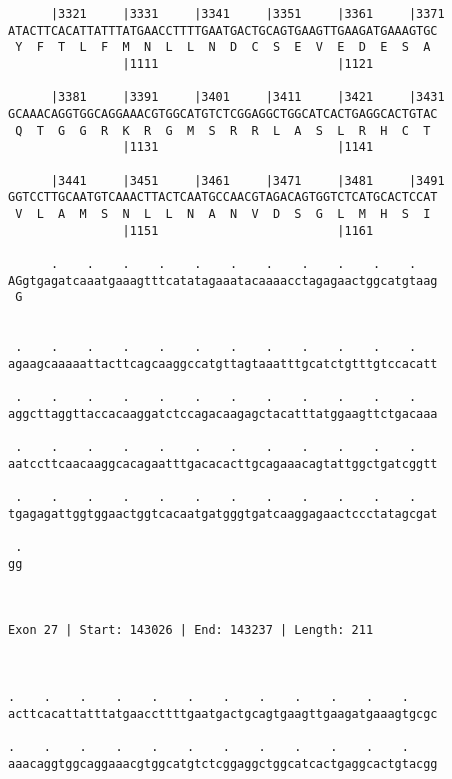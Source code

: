 \documentclass{article}
\begin{document}
\begin{Verbatim}
      |3321     |3331     |3341     |3351     |3361     |3371
ATACTTCACATTATTTATGAACCTTTTGAATGACTGCAGTGAAGTTGAAGATGAAAGTGC
 Y  F  T  L  F  M  N  L  L  N  D  C  S  E  V  E  D  E  S  A 
                |1111                         |1121         
  
      |3381     |3391     |3401     |3411     |3421     |3431
GCAAACAGGTGGCAGGAAACGTGGCATGTCTCGGAGGCTGGCATCACTGAGGCACTGTAC
 Q  T  G  G  R  K  R  G  M  S  R  R  L  A  S  L  R  H  C  T 
                |1131                         |1141         
  
      |3441     |3451     |3461     |3471     |3481     |3491
GGTCCTTGCAATGTCAAACTTACTCAATGCCAACGTAGACAGTGGTCTCATGCACTCCAT
 V  L  A  M  S  N  L  L  N  A  N  V  D  S  G  L  M  H  S  I 
                |1151                         |1161         
  
      .    .    .    .    .    .    .    .    .    .    .   
AGgtgagatcaaatgaaagtttcatatagaaatacaaaacctagagaactggcatgtaag
 G                                                          
                                                            
  
 .    .    .    .    .    .    .    .    .    .    .    .   
agaagcaaaaattacttcagcaaggccatgttagtaaatttgcatctgtttgtccacatt
                                                            
 .    .    .    .    .    .    .    .    .    .    .    .   
aggcttaggttaccacaaggatctccagacaagagctacatttatggaagttctgacaaa
                                                            
 .    .    .    .    .    .    .    .    .    .    .    .   
aatccttcaacaaggcacagaatttgacacacttgcagaaacagtattggctgatcggtt
                                                            
 .    .    .    .    .    .    .    .    .    .    .    .   
tgagagattggtggaactggtcacaatgatgggtgatcaaggagaactccctatagcgat
                                                            
 .
gg
  
  
 
Exon 27 | Start: 143026 | End: 143237 | Length: 211



.    .    .    .    .    .    .    .    .    .    .    .    
acttcacattatttatgaaccttttgaatgactgcagtgaagttgaagatgaaagtgcgc
                                                            
.    .    .    .    .    .    .    .    .    .    .    .    
aaacaggtggcaggaaacgtggcatgtctcggaggctggcatcactgaggcactgtacgg
                                                            

\end{Verbatim}
\end{document}
